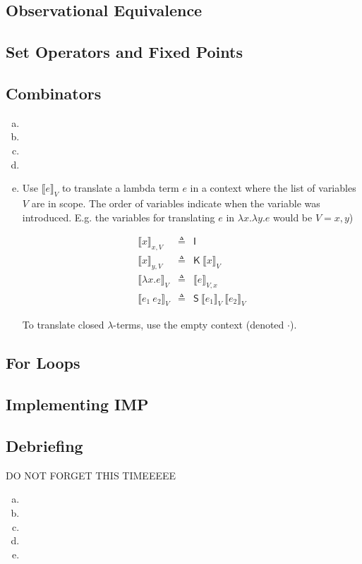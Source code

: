 \documentclass[10pt]{article}
\newcommand{\problem}[1]{\subsection*{\sf #1}}
\newcommand{\translate}[2]{\ensuremath {\llbracket #1 \rrbracket}_{#2}}
\newcommand{\defined}{\triangleq}
\renewcommand{\S}{\textsf{S}}
\newcommand{\K}{\textsf{K}}
\newcommand{\I}{\textsf{I}}
\begin{document}
\problem{1 Observational Equivalence} %
\problem{2 Set Operators and Fixed Points} %
\problem{3 Combinators} %
\begin{enumerate}[(a)]
  \item
  \item
  \item
  \item
  \item


  Use $\translate{e}{V}$ to translate a lambda term $e$ in a context
  where the list of variables $V$ are in scope. The order of variables indicate
  when the variable was introduced. E.g. the variables for translating $e$ in
  $\lambda x. \lambda y. e$ would be $V = x, y$)

  \begin{eqnarray*}
    \translate{x}{x, V}         & \defined & \I                  \\
    \translate{x}{y, V}         & \defined & \K~\translate{x}{V} \\
    \translate{\lambda x. e}{V} & \defined & \translate{e}{V,x}  \\
    \translate{e_1~e_2}{V}      & \defined & \S~\translate{e_1}{V}~\translate{e_2}{V}
  \end{eqnarray*}

  To translate closed $\lambda$-terms, use the empty context (denoted $\cdot$).

\end{enumerate}
\problem{4 For Loops} %
\problem{5 Implementing IMP} %
\problem{6 Debriefing} %
DO NOT FORGET THIS TIMEEEEE

\begin{enumerate}[(a)]
  \item
  \item
  \item
  \item
  \item
\end{enumerate}
\end{document}
